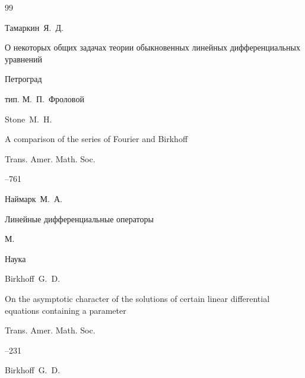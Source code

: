 \begin{thebibliography}{99}




\by Тамаркин~Я.~Д.

\book О некоторых общих задачах теории обыкновенных линейных дифференциальных уравнений

\publaddr Петроград

\publ тип. М.~П.~Фроловой





\by  Stone~M.~H.

\paper  A comparison of the series of Fourier and Birkhoff

\jour Trans. Amer. Math. Soc.




--761







\by Наймарк~М.~А.

\book Линейные дифференциальные операторы

\publaddr М.

\publ  Наука









\by Birkhoff~G.~D.

\paper  On the asymptotic character of the solutions of certain linear differential equations containing a parameter

\jour Trans. Amer. Math. Soc.




--231





\by Birkhoff~G.~D.


\end{thebibliography}
